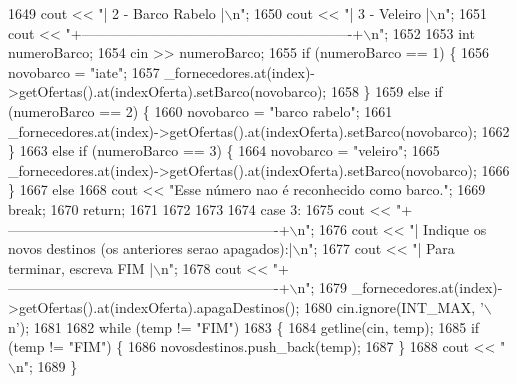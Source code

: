 \begin{DoxyCode}
1649         cout << \textcolor{stringliteral}{"| 2 - Barco Rabelo                                         |\(\backslash\)n"};
1650         cout << \textcolor{stringliteral}{"| 3 - Veleiro                                              |\(\backslash\)n"};
1651         cout << \textcolor{stringliteral}{"+----------------------------------------------------------+\(\backslash\)n"};
1652 
1653         \textcolor{keywordtype}{int} numeroBarco;
1654         cin >> numeroBarco;
1655         \textcolor{keywordflow}{if} (numeroBarco == 1) \{
1656             novobarco = \textcolor{stringliteral}{"iate"};
1657             \_fornecedores.at(index)->getOfertas().at(indexOferta).setBarco(novobarco);
1658         \}
1659         \textcolor{keywordflow}{else} \textcolor{keywordflow}{if} (numeroBarco == 2) \{
1660             novobarco = \textcolor{stringliteral}{"barco rabelo"};
1661             \_fornecedores.at(index)->getOfertas().at(indexOferta).setBarco(novobarco);
1662         \}
1663         \textcolor{keywordflow}{else} \textcolor{keywordflow}{if} (numeroBarco == 3) \{
1664             novobarco = \textcolor{stringliteral}{"veleiro"};
1665             \_fornecedores.at(index)->getOfertas().at(indexOferta).setBarco(novobarco);
1666         \}
1667         \textcolor{keywordflow}{else}
1668             cout << \textcolor{stringliteral}{"Esse número nao é reconhecido como barco."};
1669         \textcolor{keywordflow}{break};
1670         \textcolor{keywordflow}{return};
1671 
1672 
1673 
1674     \textcolor{keywordflow}{case} 3:
1675         cout << \textcolor{stringliteral}{"+----------------------------------------------------------+\(\backslash\)n"};
1676         cout << \textcolor{stringliteral}{"| Indique os novos destinos (os anteriores serao apagados):|\(\backslash\)n"};
1677         cout << \textcolor{stringliteral}{"| Para terminar, escreva FIM                               |\(\backslash\)n"};
1678         cout << \textcolor{stringliteral}{"+----------------------------------------------------------+\(\backslash\)n"};
1679         \_fornecedores.at(index)->getOfertas().at(indexOferta).apagaDestinos();
1680         cin.ignore(INT\_MAX, \textcolor{charliteral}{'\(\backslash\)n'});
1681 
1682         \textcolor{keywordflow}{while} (temp != \textcolor{stringliteral}{"FIM"})
1683         \{
1684             getline(cin, temp);
1685             \textcolor{keywordflow}{if} (temp != \textcolor{stringliteral}{"FIM"}) \{
1686                 novosdestinos.push\_back(temp);
1687             \}
1688             cout << \textcolor{stringliteral}{"\(\backslash\)n"};
1689         \}

\end{DoxyCode}

